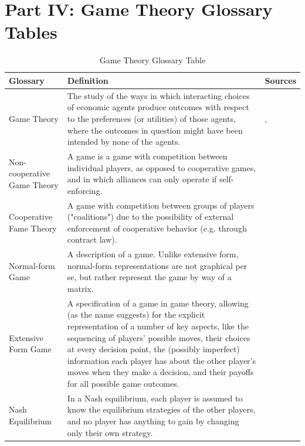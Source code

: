 \documentclass[runningheads]{llncs}
\begin{document}
\section{Part IV: Game Theory Glossary Tables}



\begin{table}
\caption{Game Theory Glossary Table}\label{tab1}
\begin{tabular}{ | m{2cm} | m{8cm}| m{4cm} | }
\hline
\textbf{Glossary} &  \textbf{Definition} & \textbf{Sources}\\
\hline

Game Theory & {The study of the ways in which interacting choices of economic agents produce outcomes with respect to the preferences (or utilities) of those agents, where the outcomes in question might have been intended by none of the agents.} & \citeauthor{ross_2019}, \citeyear{ross_2019}\\
\hline
Non-cooperative Game Theory & {A game is a game with competition between individual players, as opposed to cooperative games, and in which alliances can only operate if self-enforcing.} & \citet{tamer_2010}\\
\hline
Cooperative Fame Theory & {A game with competition between groups of players ("coalitions") due to the possibility of external enforcement of cooperative behavior (e.g. through contract law).} & \citet{shor}\\
\hline
Normal-form Game & {A description of a game. Unlike extensive form, normal-form representations are not graphical per se, but rather represent the game by way of a matrix.} & \citet{fudenberg_tirole_1991}\\
\hline
Extensive Form Game & {A specification of a game in game theory, allowing (as the name suggests) for the explicit representation of a number of key aspects, like the sequencing of players' possible moves, their choices at every decision point, the (possibly imperfect) information each player has about the other player's moves when they make a decision, and their payoffs for all possible game outcomes.} & \citet{kuhn_2003}\\
\hline
Nash Equilibrium & {In a Nash equilibrium, each player is assumed to know the equilibrium strategies of the other players, and no player has anything to gain by changing only their own strategy.
} & \citet{neumann_1947_theory}\\


\end{tabular}
\end{table}
\end{document}
